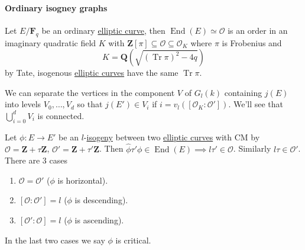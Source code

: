\documentclass[10pt,]{book}
\numberwithin{equation}{section}
\newcommand{\lb}{[}
\newcommand{\rb}{]}
\newcommand{\ZZ}{\mathbf{Z}}
\newcommand{\QQ}{\mathbf{Q}}
\newcommand{\FF}{\mathbf{F}}
\newcommand{\ints}{\mathcal{O}}
\DeclareMathOperator{\End}{End}
\DeclareMathOperator{\trace}{Tr}
\begin{document}
\paragraph[{Ordinary isogney graphs}]{Ordinary isogney graphs}\hypertarget{paragraphs-26}{}
\hypertarget{p-808}{}%
Let \(E/\FF_q\) be an ordinary \hyperref[def-supersing-isog-ec]{elliptic curve}, then \(\End(E) \simeq \ints\) is an order in an imaginary quadratic field \(K\) with \(\ZZ\lb \pi \rb \subseteq \ints \subseteq \ints_K\) where \(\pi\) is Frobenius and%
\begin{equation*}
K = \QQ(\sqrt{(\trace \pi)^2 - 4q})
\end{equation*}
by Tate, isogenous \hyperref[def-supersing-isog-ec]{elliptic curves} have the same \(\trace \pi\).%
\par
\hypertarget{p-809}{}%
We can separate the vertices in the component \(V\) of \(G_l(k)\) containing \(j(E)\) into levels \(V_0, \ldots, V_d\) so that \(j(E') \in V_i\) if \(i = v_l(\lb \ints_K : \ints'\rb)\). We'll see that \(\bigcup_{i=0}^d V_i\) is connected.%
\par
\hypertarget{p-810}{}%
Let \(\phi\colon E\to E'\) be an \(l\)-\hyperref[def-supersing-isog-isog]{isogeny} between two \hyperref[def-supersing-isog-ec]{elliptic curves} with CM by \(\ints = \ZZ+\tau\ZZ\), \(\ints ' = \ZZ+\tau'\ZZ\). Then \(\hat\phi \tau' \phi \in \End(E) \implies l\tau ' \in \ints\). Similarly \(l\tau \in \ints'\). There are 3 cases\leavevmode%
\begin{enumerate}
\item\hypertarget{li-195}{}\(\ints = \ints'\) (\(\phi\) is horizontal).%
\item\hypertarget{li-196}{}\(\lb\ints : \ints' \rb = l\) (\(\phi\) is descending).%
\item\hypertarget{li-197}{}\(\lb\ints' : \ints \rb = l\) (\(\phi\) is ascending).%
\end{enumerate}
In the last two cases we say \(\phi\) is critical.%
%
%
\typeout{************************************************}
\typeout{************************************************}
%
\end{document}
